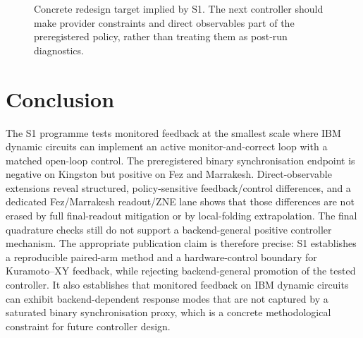 \documentclass[preprint,aps,physrev,superscriptaddress,floatfix,longbibliography]{revtex4-2}
\begin{document}
\begin{figure}[tb]
\centering
{}
\caption{Concrete redesign target implied by S1. The next controller should
make provider constraints and direct observables part of the preregistered
policy, rather than treating them as post-run diagnostics.}
\label{fig:controller-redesign}
\end{figure}

\section{Conclusion}

The S1 programme tests monitored feedback at the smallest scale where IBM
dynamic circuits can implement an active monitor-and-correct loop with a
matched open-loop control. The preregistered binary synchronisation endpoint
is negative on Kingston but positive on Fez and Marrakesh. Direct-observable
extensions reveal structured, policy-sensitive feedback/control differences,
and a dedicated Fez/Marrakesh readout/ZNE lane shows that those differences
are not erased by full final-readout mitigation or by local-folding
extrapolation. The final quadrature checks still do not support a
backend-general positive controller mechanism. The appropriate publication
claim is therefore precise: S1 establishes a reproducible paired-arm method
and a hardware-control boundary for Kuramoto--XY feedback, while rejecting
backend-general promotion of the tested controller. It also establishes that
monitored feedback on IBM dynamic circuits can exhibit backend-dependent
response modes that are not captured by a saturated binary synchronisation
proxy, which is a concrete methodological constraint for future controller
design.



\end{document}
